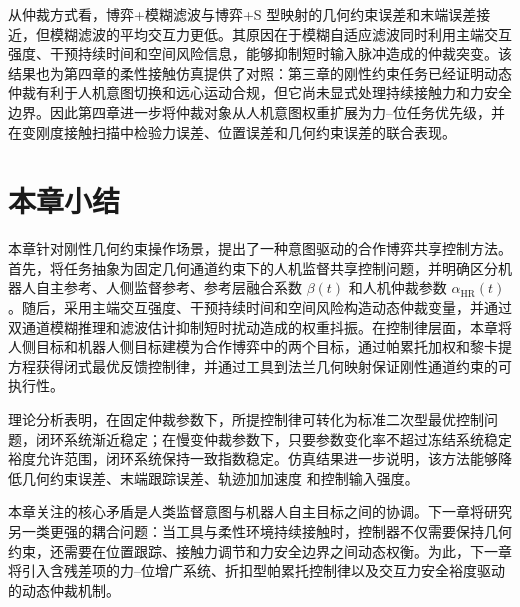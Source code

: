从仲裁方式看，博弈+模糊滤波与博弈+S 型映射的几何约束误差和末端误差接近，但模糊滤波的平均交互力更低。其原因在于模糊自适应滤波同时利用主端交互强度、干预持续时间和空间风险信息，能够抑制短时输入脉冲造成的仲裁突变。该结果也为第四章的柔性接触仿真提供了对照：第三章的刚性约束任务已经证明动态仲裁有利于人机意图切换和远心运动合规，但它尚未显式处理持续接触力和力安全边界。因此第四章进一步将仲裁对象从人机意图权重扩展为力--位任务优先级，并在变刚度接触扫描中检验力误差、位置误差和几何约束误差的联合表现。

\section{本章小结}
\label{sec:ch3_summary}

本章针对刚性几何约束操作场景，提出了一种意图驱动的合作博弈共享控制方法。首先，将任务抽象为固定几何通道约束下的人机监督共享控制问题，并明确区分机器人自主参考、人侧监督参考、参考层融合系数 $\beta(t)$ 和人机仲裁参数 $\alpha_{\mathrm{HR}}(t)$。随后，采用主端交互强度、干预持续时间和空间风险构造动态仲裁变量，并通过双通道模糊推理和滤波估计抑制短时扰动造成的权重抖振。在控制律层面，本章将人侧目标和机器人侧目标建模为合作博弈中的两个目标，通过帕累托加权和黎卡提方程获得闭式最优反馈控制律，并通过工具到法兰几何映射保证刚性通道约束的可执行性。

理论分析表明，在固定仲裁参数下，所提控制律可转化为标准二次型最优控制问题，闭环系统渐近稳定；在慢变仲裁参数下，只要参数变化率不超过冻结系统稳定裕度允许范围，闭环系统保持一致指数稳定。仿真结果进一步说明，该方法能够降低几何约束误差、末端跟踪误差、轨迹加加速度 和控制输入强度。

本章关注的核心矛盾是人类监督意图与机器人自主目标之间的协调。下一章将研究另一类更强的耦合问题：当工具与柔性环境持续接触时，控制器不仅需要保持几何约束，还需要在位置跟踪、接触力调节和力安全边界之间动态权衡。为此，下一章将引入含残差项的力--位增广系统、折扣型帕累托控制律以及交互力安全裕度驱动的动态仲裁机制。
